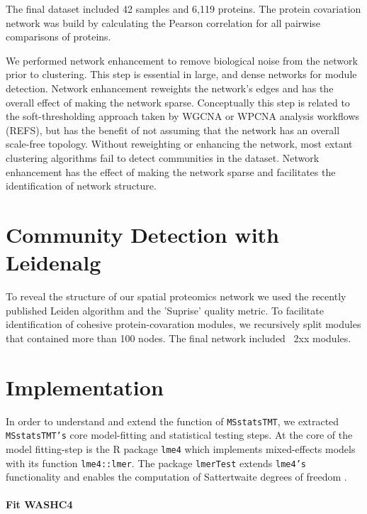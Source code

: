 \documentclass[11pt]{elife}\usepackage[]{graphicx}\usepackage[]{color}
\begin{document}
The final dataset included 42 samples and 6,119 proteins. The protein
covariation network was build by calculating the Pearson correlation for all
pairwise comparisons of proteins.

We performed network enhancement to remove biological noise from the network
prior to clustering. This step is essential in large, and dense networks for
module detection. Network enhancement reweights the
network's edges and has the overall effect of making the network sparse.
Conceptually this step is related to the soft-thresholding approach taken by
WGCNA or WPCNA analysis workflows (REFS), but has the benefit of not assuming
that the network has an overall scale-free topology.  Without reweighting or
enhancing the network, most extant clustering algorithms fail to detect
communities in the dataset.  Network enhancement has the effect of making the
network sparse and facilitates the identification of network structure.\\


\section{Community Detection with Leidenalg}

To reveal the structure of our spatial proteomics network we used the recently
published Leiden algorithm \citep{Traag2019} and the 'Suprise' quality metric.
To facilitate identification of cohesive protein-covaration modules, we
recursively split modules that contained more than 100 nodes. The final network
included ~2xx modules.

\section{Implementation}


In order to understand and extend the function of \texttt{MSstatsTMT}, we
extracted \texttt{MSstatsTMT's} core model-fitting and statistical testing
steps.  At the core of the model fitting-step is the R package \texttt{lme4}
which implements mixed-effects models with its function
\texttt{lme4::lmer}\citep{Bates2015}. The package \texttt{lmerTest} extends
\texttt{lme4's} functionality and enables the computation of Sattertwaite
degrees of freedom \citep{Kuznetsova2017}. 

\paragraph{Fit WASHC4}
\end{document}
